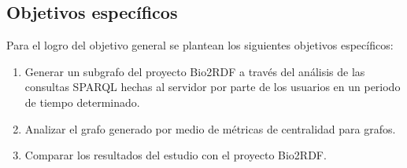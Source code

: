 \subsection{Objetivos específicos}
Para el logro del objetivo general se plantean los siguientes objetivos
específicos:
\begin{enumerate}
  \item
    Generar un subgrafo del proyecto Bio2RDF a través del análisis de las
    consultas SPARQL hechas al servidor por parte de los usuarios en un periodo
    de tiempo determinado.
  \item
    Analizar el grafo generado por medio de métricas de centralidad para grafos.
  \item
    Comparar los resultados del estudio con el proyecto Bio2RDF.
\end{enumerate}
